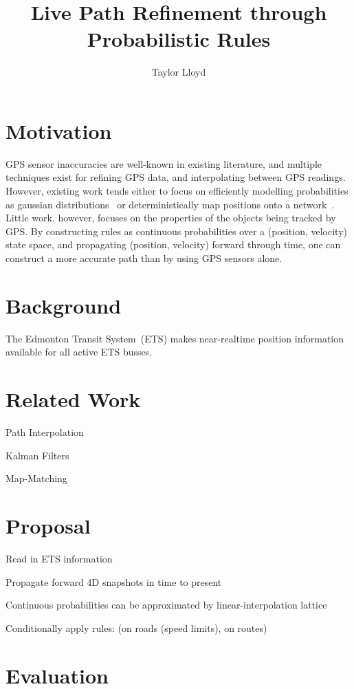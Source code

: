 \documentclass{article}
\begin{document}
\title{Live Path Refinement through Probabilistic Rules}
\author{Taylor Lloyd}

\maketitle

\section{Motivation}
    GPS sensor inaccuracies are well-known in existing literature, and multiple techniques exist for refining GPS data, and interpolating between GPS readings.
    However, existing work tends either to focus on efficiently modelling probabilities as gaussian distributions~\cite{} or deterministically map positions onto a network~\cite{}.
    Little work, however, focuses on the properties of the objects being tracked by GPS. By constructing rules as continuous probabilities over a (position, velocity) state space, and propagating (position, velocity) forward through time, one can construct a more accurate path than by using GPS sensors alone.

\section{Background}
    The Edmonton Transit System~(ETS) makes near-realtime position information available for all active ETS busses.

\section{Related Work}
  Path Interpolation

  Kalman Filters

  Map-Matching

\section{Proposal}

Read in ETS information

Propagate forward 4D snapshots in time to present

Continuous probabilities can be approximated by linear-interpolation lattice

Conditionally apply rules: (on roads (speed limits), on routes)

\section{Evaluation}
\end{document}
